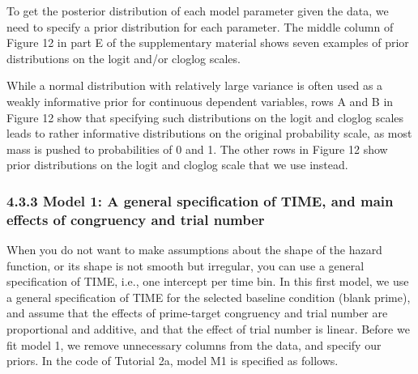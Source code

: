 \documentclass[
  man,floatsintext]{apa6}
\begin{document}
To get the posterior distribution of each model parameter given the data, we need to specify a prior distribution for each parameter. The middle column of Figure 12 in part E of the supplementary material shows seven examples of prior distributions on the logit and/or cloglog scales.

While a normal distribution with relatively large variance is often used as a weakly informative prior for continuous dependent variables, rows A and B in Figure 12 show that specifying such distributions on the logit and cloglog scales leads to rather informative distributions on the original probability scale, as most mass is pushed to probabilities of 0 and 1. The other rows in Figure 12 show prior distributions on the logit and cloglog scale that we use instead.

\subsubsection{4.3.3 Model 1: A general specification of TIME, and main effects of congruency and trial number}\label{model-1-a-general-specification-of-time-and-main-effects-of-congruency-and-trial-number}

When you do not want to make assumptions about the shape of the hazard function, or its shape is not smooth but irregular, you can use a general specification of TIME, i.e., one intercept per time bin. In this first model, we use a general specification of TIME for the selected baseline condition (blank prime), and assume that the effects of prime-target congruency and trial number are proportional and additive, and that the effect of trial number is linear.
Before we fit model 1, we remove unnecessary columns from the data, and specify our priors. In the code of Tutorial 2a, model M1 is specified as follows.

\scriptsize
\end{document}
